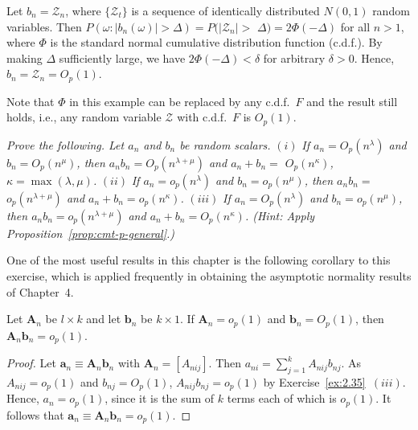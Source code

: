\begin{example}\label{ex:Op-normal}
Let $b_n = \mathcal{Z}_n$, where $\{\mathcal{Z}_t\}$ is a sequence of identically distributed $N(0,1)$ random variables. Then $P(\omega : |b_n(\omega)| > \Delta) = P(|\mathcal{Z}_n| >$
$\Delta) = 2\Phi(-\Delta)$ for all $n > 1$, where $\Phi$ is the standard normal cumulative distribution function (c.d.f.). By making $\Delta$ sufficiently large, we have
$2\Phi(-\Delta) < \delta$ for arbitrary $\delta > 0$. Hence, $b_n = \mathcal{Z}_n = O_p(1)$.
\end{example}

Note that $\Phi$ in this example can be replaced by any c.d.f.\ $F$ and the
result still holds, i.e., any random variable $\mathcal{Z}$ with c.d.f.\ $F$ is $O_p(1)$.

\begin{exercises}
\item\label{ex:2.35} \emph{Prove the following. Let $a_n$ and $b_n$ be random scalars.} $(i)$
\emph{If $a_n = O_p(n^{\lambda})$ and $b_n = O_p(n^{\mu})$, then $a_nb_n = O_p(n^{\lambda+\mu})$ and $a_n + b_n =$
$O_p(n^{\kappa})$, $\kappa = \max(\lambda,\mu)$.} $(ii)$ \emph{If $a_n = o_p(n^{\lambda})$ and $b_n = o_p(n^{\mu})$, then $a_nb_n =$
$o_p(n^{\lambda+\mu})$ and $a_n + b_n = o_p(n^{\kappa})$.} $(iii)$ \emph{If $a_n = O_p(n^{\lambda})$ and $b_n = o_p(n^{\mu})$, then
$a_nb_n = o_p(n^{\lambda+\mu})$ and $a_n + b_n = O_p(n^{\kappa})$. (Hint: Apply Proposition~\ref{prop:cmt-p-general}.)}
\end{exercises}

One of the most useful results in this chapter is the following corollary
to this exercise, which is applied frequently in obtaining the asymptotic
normality results of Chapter~4.

\begin{corollary}\label{cor:product-rule}
Let $\mathbf{A}_n$ be $l \times k$ and let $\mathbf{b}_n$ be $k \times 1$. If
$\mathbf{A}_n = o_p(1)$ and $\mathbf{b}_n = O_p(1)$, then $\mathbf{A}_n\mathbf{b}_n = o_p(1)$.
\end{corollary}

\begin{proof}
Let $\mathbf{a}_n \equiv \mathbf{A}_n\mathbf{b}_n$ with $\mathbf{A}_n = [A_{nij}]$. Then $a_{ni} = \sum_{j=1}^k A_{nij}b_{nj}$. As
$A_{nij} = o_p(1)$ and $b_{nj} = O_p(1)$, $A_{nij}b_{nj} = o_p(1)$ by Exercise~\ref{ex:2.35}~$(iii)$.
Hence, $a_n = o_p(1)$, since it is the sum of $k$ terms each of which is $o_p(1)$. It
follows that $\mathbf{a}_n \equiv \mathbf{A}_n\mathbf{b}_n = o_p(1)$.
\end{proof}

